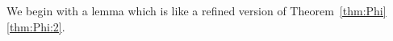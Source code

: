 \documentclass[12pt]{amsart}
\newtheorem{lemma}{Lemma}[section]
\theoremstyle{definition}
\theoremstyle{remark}
\newcommand{\PP}{\mathbb{P}}
\newcommand{\bb}{c}
\newcommand{\cE}{\mathcal{E}}
\newcommand{\FF}{\mathbf{F}}
\newcommand{\DD}{\mathrm{D}}
\begin{document}
We begin with a lemma which is like a refined version of Theorem~\ref{thm:Phi}\eqref{thm:Phi:2}.  


\end{document}
